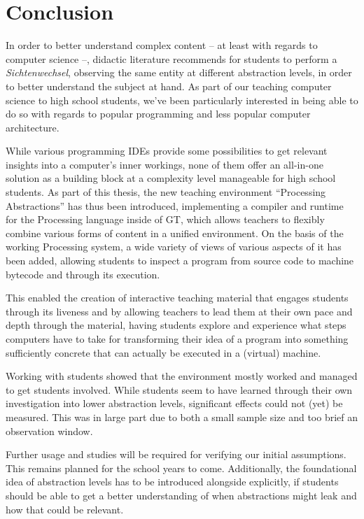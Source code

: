 
\chapter{Conclusion} \label{ch_conclusion}

In order to better understand complex content -- at least with regards to computer science --, didactic literature recommends for students to perform a \emph{Sichtenwechsel}, \ie observing the same entity at different abstraction levels, in order to better understand the subject at hand. As part of our teaching computer science to high school students, we've been particularly interested in being able to do so with regards to popular programming and less popular computer architecture.

While various programming \acp{IDE} provide some possibilities to get relevant insights into a computer's inner workings, none of them offer an all-in-one solution as a building block at a complexity level manageable for high school students. As part of this thesis, the new teaching environment ``Processing Abstractions'' has thus been introduced, implementing a compiler and runtime for the Processing language inside of \acf{GT}, which allows teachers to flexibly combine various forms of content in a unified environment. On the basis of the working Processing system, a wide variety of views of various aspects of it has been added, allowing students to inspect a program from source code to machine bytecode and through its execution.

This enabled the creation of interactive teaching material that engages students through its liveness and by allowing teachers to lead them at their own pace and depth through the material, having students explore and experience what steps computers have to take for transforming their idea of a program into something sufficiently concrete that can actually be executed in a (virtual) machine.

Working with students showed that the environment mostly worked and managed to get students involved. While students seem to have learned through their own investigation into lower abstraction levels, significant effects could not (yet) be measured. This was in large part due to both a small sample size and too brief an observation window.

Further usage and studies will be required for verifying our initial assumptions. This remains planned for the school years to come. Additionally, the foundational idea of abstraction levels has to be introduced alongside explicitly, if students should be able to get a better understanding of when abstractions might leak and how that could be relevant.



